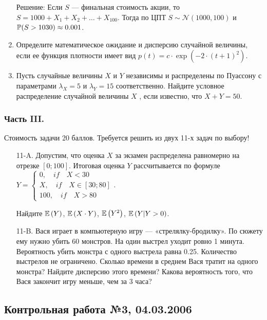 \documentclass[12pt, a4paper]{article}\usepackage[]{graphicx}\usepackage[]{color}
\begin{document}
\begin{enumerate}
Решение: Если $S$ — финальная стоимость акции, то $S=1000+X_1+X_2+\ldots+X_{100}$. Тогда по ЦПТ $S\sim \mathcal{N}(1000,100)$ и $\P(S>1030)\approx 0.001$.

\item Определите математическое ожидание и дисперсию случайной величины, если ее функция плотности имеет вид  $p\left(t\right)=c\cdot \exp \left(-2\cdot \left(t+1\right)^{2} \right)$.
\item Пусть случайные величины  $X$  и  $Y$  независимы и распределены по Пуассону с параметрами  $\lambda _{X} =5$  и  $\lambda _{Y} =15$  соответственно. Найдите условное распределение случайной величины  $X$ , если известно, что  $X+Y=50$.
\end{enumerate}

\subsubsection*{Часть III.}

Стоимость задачи 20 баллов.
Требуется решить {\bf {}} из двух 11-х задач по выбору!
\begin{enumerate}
\item[11-A.] Допустим, что оценка  $X$  за экзамен распределена равномерно на отрезке  $\left[0;100\right]$. Итоговая оценка  $Y$  рассчитывается по формуле  $Y=\left\{\begin{array}{l} {0,\quad if\quad X<30} \\ {X,\quad if\quad X\in \left[30;80\right]} \\ {100,\quad if\quad X>80} \end{array}\right. $.

Найдите  $\E\left(Y\right)$,  $\E\left(X\cdot Y\right)$,  $\E\left(Y^{2} \right)$,  $\E\left(Y|Y>0\right)$.

\item[11-B.] Вася играет в компьютерную игру — «стрелялку-бродилку». По сюжету ему нужно убить 60 монстров. На один выстрел уходит ровно 1 минута. Вероятность убить монстра с одного выстрела равна 0.25. Количество выстрелов не ограничено. Сколько времени в среднем Вася тратит на одного монстра? Найдите дисперсию этого времени? Какова вероятность того, что Вася закончит игру меньше, чем за 3 часа?
\end{enumerate}

\subsection{Контрольная работа №3, 04.03.2006}
\end{document}
